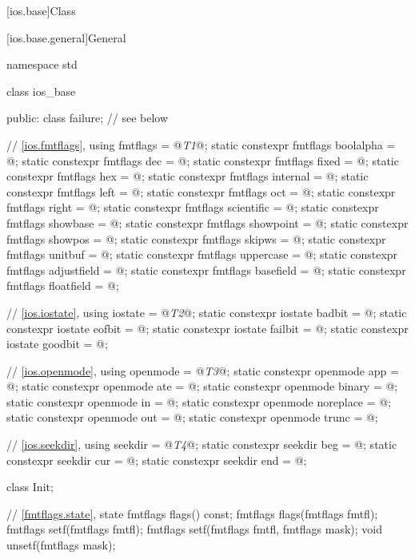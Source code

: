[ios.base]{Class }

[ios.base.general]{General}
%
\begin{codeblock}
namespace std {
  class ios_base {
  public:
    class failure;              // see below

    // \ref{ios.fmtflags}, 
    using fmtflags = @\textit{T1}@;
    static constexpr fmtflags boolalpha = @\unspec@;
    static constexpr fmtflags dec = @\unspec@;
    static constexpr fmtflags fixed = @\unspec@;
    static constexpr fmtflags hex = @\unspec@;
    static constexpr fmtflags internal = @\unspec@;
    static constexpr fmtflags left = @\unspec@;
    static constexpr fmtflags oct = @\unspec@;
    static constexpr fmtflags right = @\unspec@;
    static constexpr fmtflags scientific = @\unspec@;
    static constexpr fmtflags showbase = @\unspec@;
    static constexpr fmtflags showpoint = @\unspec@;
    static constexpr fmtflags showpos = @\unspec@;
    static constexpr fmtflags skipws = @\unspec@;
    static constexpr fmtflags unitbuf = @\unspec@;
    static constexpr fmtflags uppercase = @\unspec@;
    static constexpr fmtflags adjustfield = @\seebelow@;
    static constexpr fmtflags basefield = @\seebelow@;
    static constexpr fmtflags floatfield = @\seebelow@;

    // \ref{ios.iostate}, 
    using iostate = @\textit{T2}@;
    static constexpr iostate badbit = @\unspec@;
    static constexpr iostate eofbit = @\unspec@;
    static constexpr iostate failbit = @\unspec@;
    static constexpr iostate goodbit = @\seebelow@;

    // \ref{ios.openmode}, 
    using openmode = @\textit{T3}@;
    static constexpr openmode app = @\unspec@;
    static constexpr openmode ate = @\unspec@;
    static constexpr openmode binary = @\unspec@;
    static constexpr openmode in = @\unspec@;
    static constexpr openmode noreplace = @\unspec@;
    static constexpr openmode out = @\unspec@;
    static constexpr openmode trunc = @\unspec@;

    // \ref{ios.seekdir}, 
    using seekdir = @\textit{T4}@;
    static constexpr seekdir beg = @\unspec@;
    static constexpr seekdir cur = @\unspec@;
    static constexpr seekdir end = @\unspec@;

    class Init;

    // \ref{fmtflags.state},  state
    fmtflags flags() const;
    fmtflags flags(fmtflags fmtfl);
    fmtflags setf(fmtflags fmtfl);
    fmtflags setf(fmtflags fmtfl, fmtflags mask);
    void unsetf(fmtflags mask);

}}
\end{codeblock}
